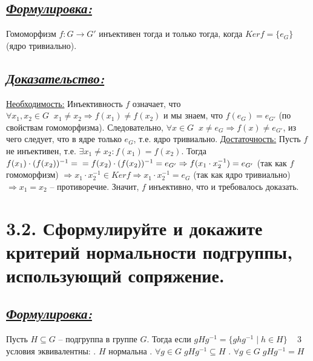 \documentclass{article}
\begin{document}
\subsection*{\Large \underline{\textit{Формулировка: }}}
Гомоморфизм $f : G \rightarrow G'$ инъективен тогда и только тогда, когда $Kerf = \{e_G\}$ (ядро тривиально).

\subsection*{\Large \underline{\textit{Доказательство: }}}

$ $\indent\underline{Необходимость:}
\newline Инъективность $f$ означает, что $\forall x_1, x_2 \in G \;\; x_1 \ne x_2 \Rightarrow f(x_1) \ne f(x_2)$ и мы знаем, что $f(e_G) = e_{G'}$ (по свойствам гомоморфизма). Следовательно, \newline $\forall x \in G \;\; x \ne e_G \Rightarrow f(x) \ne e_{G'}$, из чего следует, что в ядре только $e_G$, т.е. ядро тривиально.
\newline \indent \underline{Достаточность:}
\newline Пусть $f$ не инъективен, т.е. $\exists x_1 \ne x_2 : f(x_1) = f(x_2)$. Тогда $f(x_1) \cdot (f(x_2))^{-1} = 
\newline = f(x_2) \cdot (f(x_2))^{-1} = e_{G'} \Rightarrow f(x_1 \cdot x_2^{-1}) = e_{G'}$ (так как $f$ гомоморфизм) $\Rightarrow x_1\cdot x_2^{-1} \in Kerf \Rightarrow x_1\cdot x_2^{-1} = e_{G}$ (так как ядро тривиально) $\Rightarrow x_1 = x_2$ -- противоречие. Значит, $f$ инъективно, что и требовалось доказать.

\section*{\LARGE 3.2. Сформулируйте и докажите критерий нормальности подгруппы, использующий сопряжение. }
\subsection*{\Large \underline{\textit{Формулировка: }}}
Пусть $H \subseteq G$ -- подгруппа в группе $G$. Тогда если $gHg^{-1} = \{ghg^{-1}\;|\;h\in H\}\;\;\;$ 3 условия эквивалентны:
\newline {}. $H$ нормальна
\newline {}. $\forall g \in G \; gHg^{-1} \subseteq H $
\newline {}. $\forall g \in G \; gHg^{-1} = H $
\end{document}
